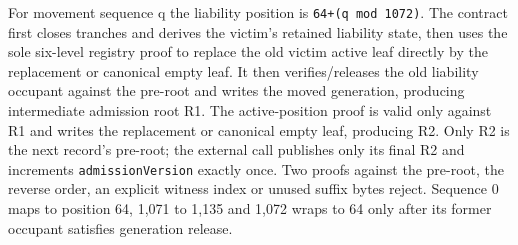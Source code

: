 \documentclass[a4paper,11pt]{article}
\newcommand{\code}[1]{\nolinkurl{#1}}
\begin{document}
For movement sequence q the liability position is
\code{64+(q mod 1072)}.  The contract first closes tranches and derives the
victim's retained liability state, then uses the sole six-level registry proof
to replace the old victim active leaf directly by the replacement or canonical
empty leaf.  It then verifies/releases the old liability occupant
against the pre-root and writes the moved generation, producing intermediate
admission root R1.  The active-position proof is valid only against R1 and
writes the replacement or canonical empty leaf, producing R2.  Only R2 is
the next record's pre-root; the external call publishes only its final R2 and
increments \code{admissionVersion} exactly once.  Two proofs
against the pre-root, the reverse order, an explicit witness index or unused
suffix bytes reject.  Sequence 0 maps to position 64, 1,071 to 1,135 and 1,072
wraps to 64 only after its former occupant satisfies generation release.
\end{document}
